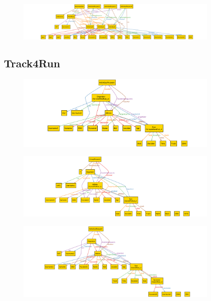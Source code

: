\documentclass[a4paper]{article}
\begin{document}
    \begin{figure}[!htpb]
    	\centering
    	\includegraphics[width=100mm]{images/alloy/AutomatedSos+Data4HelpComplete.png}
    \end{figure}

\subsection{Track4Run}




\begin{figure}[!htpb]
	\centering
	\includegraphics[width=100mm]{images/alloy/createNewRun.png}
\end{figure}



\begin{figure}[!htpb]
	\centering
	\includegraphics[width=100mm]{images/alloy/enrollToRun.png}
\end{figure}



\begin{figure}[!htpb]
	\centering
	\includegraphics[width=100mm]{images/alloy/watchRun.png}
\end{figure}
\end{document}

